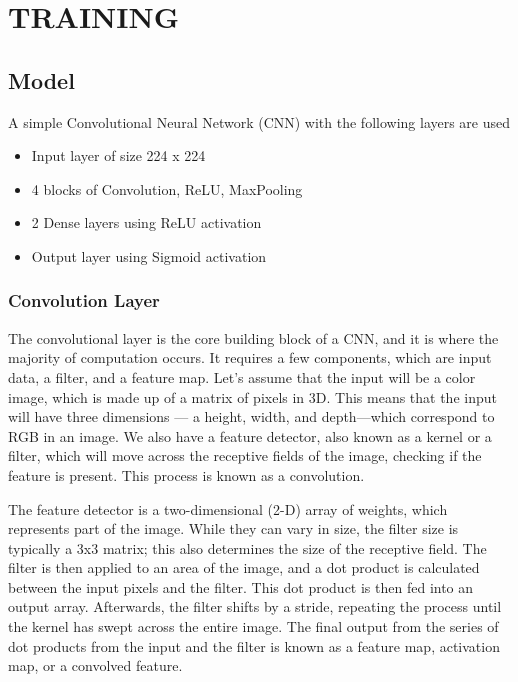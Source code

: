 \chapter{TRAINING}
\graphicspath{{Chapter3/}}

\section{Model}

A simple Convolutional Neural Network (CNN) with the following
layers are used

\begin{itemize}
    \item Input layer of size 224 x 224
    \item 4 blocks of Convolution, ReLU, MaxPooling
    \item 2 Dense layers using ReLU activation
    \item Output layer using Sigmoid activation
\end{itemize}

\subsection{Convolution Layer}
The convolutional layer is the core building block of a CNN, and it is where the majority of computation occurs. It requires a few components, which are input data, a filter, and a feature map. Let’s assume that the input will be a color image, which is made up of a matrix of pixels in 3D. This means that the input will have three dimensions — a height, width, and depth—which correspond to RGB in an image. We also have a feature detector, also known as a kernel or a filter, which will move across the receptive fields of the image, checking if the feature is present. This process is known as a convolution.

The feature detector is a two-dimensional (2-D) array of weights, which represents part of the image. While they can vary in size, the filter size is typically a 3x3 matrix; this also determines the size of the receptive field. The filter is then applied to an area of the image, and a dot product is calculated between the input pixels and the filter. This dot product is then fed into an output array. Afterwards, the filter shifts by a stride, repeating the process until the kernel has swept across the entire image. The final output from the series of dot products from the input and the filter is known as a feature map, activation map, or a convolved feature.

